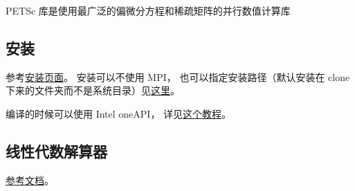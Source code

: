
\begin{issues}
\issueDraft
\end{issues}

PETSc 库是使用最广泛的偏微分方程和稀疏矩阵的并行数值计算库

\subsection{安装}
参考\href{https://petsc.org/release/install/install_tutorial/}{安装页面}。
安装可以不使用 MPI， 也可以指定安装路径（默认安装在 clone 下来的文件夹而不是系统目录）见\href{https://petsc.org/release/install/install/#mpi-problems-i-don-t-want-mpi}{这里}。

编译的时候可以使用 Intel oneAPI， 详见\href{https://www.intel.com/content/www/us/en/developer/articles/technical/mkl-blas-lapack-with-petsc.html}{这个教程}。

\subsection{线性代数解算器}
\href{https://petsc.org/release/docs/manual/ksp/}{参考文档}。
